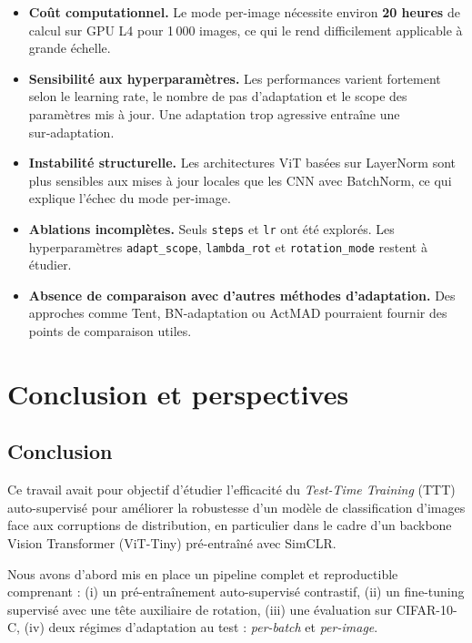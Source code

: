 \documentclass[12pt,a4paper]{report}
\begin{document}
	\begin{itemize}
		\item \textbf{Coût computationnel.}  
		Le mode per-image nécessite environ \textbf{20 heures} de calcul sur GPU L4 pour 1\,000 images, ce qui le rend difficilement applicable à grande échelle.
		
		\item \textbf{Sensibilité aux hyperparamètres.}  
		Les performances varient fortement selon le learning rate, le nombre de pas d’adaptation et le scope des paramètres mis à jour.  
		Une adaptation trop agressive entraîne une sur‑adaptation.
		
		\item \textbf{Instabilité structurelle.}  
		Les architectures ViT basées sur LayerNorm sont plus sensibles aux mises à jour locales que les CNN avec BatchNorm, ce qui explique l’échec du mode per-image.
		
		\item \textbf{Ablations incomplètes.}  
		Seuls \texttt{steps} et \texttt{lr} ont été explorés.  
		Les hyperparamètres \texttt{adapt\_scope}, \texttt{lambda\_rot} et \texttt{rotation\_mode} restent à étudier.
		
		\item \textbf{Absence de comparaison avec d’autres méthodes d’adaptation.}  
		Des approches comme Tent, BN-adaptation ou ActMAD pourraient fournir des points de comparaison utiles.
	\end{itemize}
	
	\chapter{Conclusion et perspectives}
	
	\section{Conclusion}
	
	Ce travail avait pour objectif d’étudier l’efficacité du \emph{Test-Time Training} (TTT) auto-supervisé pour améliorer la robustesse d’un modèle de classification d’images face aux corruptions de distribution, en particulier dans le cadre d’un backbone Vision Transformer (ViT-Tiny) pré-entraîné avec SimCLR.
	
	Nous avons d’abord mis en place un pipeline complet et reproductible comprenant :  
	(i) un pré-entraînement auto-supervisé contrastif,  
	(ii) un fine-tuning supervisé avec une tête auxiliaire de rotation,  
	(iii) une évaluation sur CIFAR-10-C,  
	(iv) deux régimes d’adaptation au test : \emph{per-batch} et \emph{per-image}.
	
\end{document}
